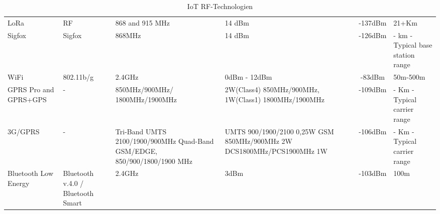 \begin{landscape}
\begin{table}[H]
\begin{tabulary}{\paperwidth}{m{3cm} m{2cm} m{4cm} m{4cm} C m{2cm}}
LoRa                       & RF                                & 868 and 915 MHz                                                                                          & 14 dBm                                                                         & -137dBm             & 21+Km                             \\
Sigfox                     & Sigfox                            & 868MHz                                                                                                   & 14 dBm                                                                         & -126dBm             & - km - Typical base station range \\
WiFi                       & 802.11b/g                         & 2.4GHz                                                                                                   & 0dBm - 12dBm                                                                   & -83dBm              & 50m-500m                          \\
GPRS Pro and GPRS+GPS      & -                                 & 850MHz/900MHz/ 1800MHz/1900MHz                                                                           & 2W(Class4) 850MHz/900MHz, 1W(Class1) 1800MHz/1900MHz                           & -109dBm             & - Km - Typical carrier range      \\
3G/GPRS                    & -                                 & Tri-Band UMTS 2100/1900/900MHz Quad-Band GSM/EDGE, 850/900/1800/1900 MHz                                 & UMTS 900/1900/2100 0,25W GSM 850MHz/900MHz 2W DCS1800MHz/PCS1900MHz 1W         & -106dBm             & - Km - Typical carrier range      \\
Bluetooth Low Energy       & Bluetooth v.4.0 / Bluetooth Smart & 2.4GHz                                                                                                   & 3dBm                                                                           & -103dBm             & 100m
\end{tabulary}
\endgroup
\caption{IoT RF-Technologien}
\label{fig:IoT RF-Technologien}
\end{table}

\end{landscape}